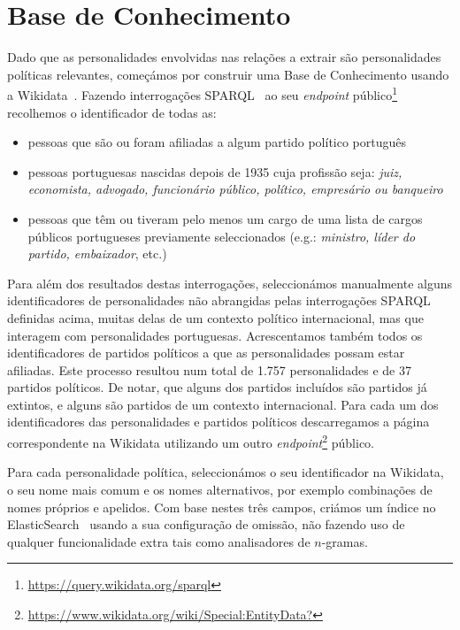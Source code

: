\documentclass[a4paper, twocolumn, 11pt, twoside]{article}
\begin{document}
\section{Base de Conhecimento}
\label{sec_kb}
Dado que as personalidades envolvidas nas relações a extrair são personalidades políticas relevantes, começámos por construir uma Base de Conhecimento usando a Wikidata~\citep{MKGGB2018}. Fazendo interrogações SPARQL~\cite{2013sparql} ao seu \textit{endpoint} público\footnote{\url{https://query.wikidata.org/sparql}} recolhemos o identificador de todas as:

\begin{itemize}  
\item pessoas que são ou foram afiliadas a algum partido político português
\item pessoas portuguesas nascidas depois de 1935 cuja profissão seja: \textit{juiz, economista, advogado, funcionário público, político, empresário ou banqueiro}
\item pessoas que têm ou tiveram pelo menos um cargo de uma lista de cargos públicos portugueses previamente seleccionados (e.g.: \textit{ministro, líder do partido, embaixador}, etc.)
\end{itemize}  

Para além dos resultados destas interrogações, seleccionámos manualmente alguns identificadores de personalidades não abrangidas pelas interrogações SPARQL definidas acima, muitas delas de um contexto político internacional, mas que interagem com personalidades portuguesas. Acrescentamos também todos os identificadores de partidos políticos a que as personalidades possam estar afiliadas. Este processo resultou num total de 1.757 personalidades e de 37 partidos políticos. De notar, que alguns dos partidos incluídos são partidos já extintos, e alguns são partidos de um contexto internacional. Para cada um dos identificadores das personalidades e partidos políticos descarregamos a página correspondente na Wikidata utilizando um outro \textit{endpoint}\footnote{\url{https://www.wikidata.org/wiki/Special:EntityData?}} público.


Para cada personalidade política, seleccionámos o seu identificador na Wikidata, o seu nome mais comum e os nomes alternativos, por exemplo combinações de nomes próprios e apelidos. Com base nestes três campos, criámos um índice no ElasticSearch~\citep{10.5555/2904394} usando a sua configuração de omissão, não fazendo uso de qualquer funcionalidade extra tais como analisadores de $n$-gramas.
\end{document}
